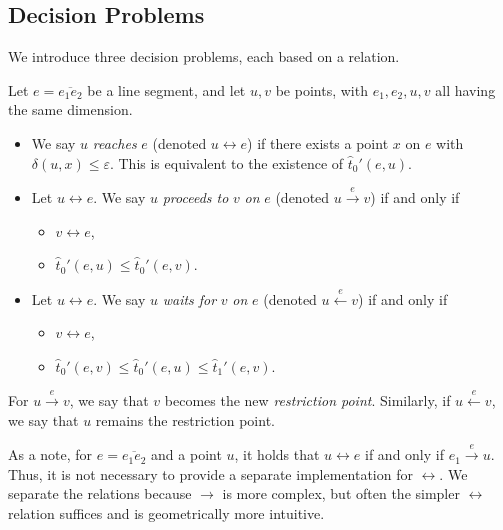 \subsection{Decision Problems}
We introduce three decision problems, each based on a relation.
\begin{definition}\label{def:implicit_relations}
  Let \(e = \overline{e_1e_2}\) be a line segment, and let \(u, v\) be points, with \(e_1, e_2, u, v\) all having the same dimension.
  \begin{itemize}
    \item We say \(u\) \emph{reaches} \(e\) (denoted \(u \leftrightarrow e\)) if there exists a point \(x\) on \(e\) with \(\delta(u,x)\leq \varepsilon\). This is equivalent to the existence of \(\hat t_0'(e, u)\).
    \item Let \(u \leftrightarrow e\). We say \(u\) \emph{proceeds to} \(v\) \emph{on} \(e\) (denoted \(u \overset{e}\rightarrow v\)) if and only if
      \begin{itemize}
        \item \(v \leftrightarrow e\),
        \item \(\hat t_0'(e, u) \leq \hat t_0'(e, v)\).
      \end{itemize}

    \item Let \(u \leftrightarrow e\). We say \(u\) \emph{waits for} \(v\) \emph{on} \(e\) (denoted \(u \overset{e}\leftarrow v\)) if and only if
      \begin{itemize}
        \item \(v \leftrightarrow e\),
				\item \(\hat t_0'(e, v) \leq \hat t_0'(e, u) \leq \hat t_1'(e, v)\).
      \end{itemize}
  \end{itemize}
  For \(u \overset e\rightarrow v\), we say that \(v\) becomes the new \emph{restriction point}. Similarly, if \(u \overset e\leftarrow v\), we say that \(u\) remains the restriction point.
\end{definition}

As a note, for \(e = \overline{e_1e_2}\) and a point \(u\), it holds that \(u \leftrightarrow e\) if and only if \(e_1 \overset{e}\rightarrow u\). Thus, it is not necessary to provide a separate implementation for \(\leftrightarrow\). We separate the relations because \(\rightarrow\) is more complex, but often the simpler \(\leftrightarrow\) relation suffices and is geometrically more intuitive.

